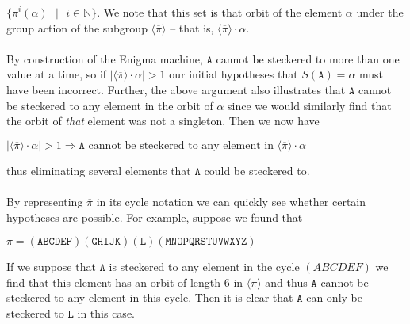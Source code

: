 $\{\overline{\pi}^i(\alpha)\text{ }\vert\text{ }i\in\mathbb{N}\}$.
We note that this set is that orbit of the element $\alpha$ under the
group action of the subgroup $\langle\overline{\pi}\rangle$ -- that is,
$\langle\overline{\pi}\rangle\cdot\alpha$.
\\\\By construction of the Enigma machine, $\texttt{A}$ cannot be steckered to
more than one value at a time, so if
$|\langle\overline{\pi}\rangle\cdot\alpha| > 1$ our initial
hypotheses that $S(\texttt{A}) = \alpha$ must have been incorrect. Further,
the above argument also illustrates that $\texttt{A}$ cannot be steckered to
any element in the orbit of $\alpha$ since
we would similarly find that the orbit of \emph{that} element was not a
singleton. Then we now have
\begin{center}
	$|\langle\overline{\pi}\rangle\cdot\alpha| > 1 \Rightarrow
		\texttt{A} \text{ cannot be steckered to any element in
		}\langle\overline{\pi}\rangle\cdot\alpha$
\end{center}
thus eliminating several elements that $\texttt{A}$ could be steckered to.
\\\\By representing $\overline\pi$ in its cycle notation we can
quickly see whether certain hypotheses are possible. For example,
suppose we found that
\begin{center}
	$\overline\pi =
		(\texttt{ABCDEF})(\texttt{GHIJK})(\texttt{L})(\texttt{MNOPQRSTUVWXYZ})$
\end{center}
If we suppose that $\texttt{A}$ is steckered to any element in the cycle
$(ABCDEF)$ we find that this
element has an orbit of length $6$ in $\langle\overline\pi\rangle$
and thus $\texttt{A}$ cannot be steckered
to any element in this cycle. Then it is clear that $\texttt{A}$ can only be
steckered to $\texttt{L}$ in this case.

